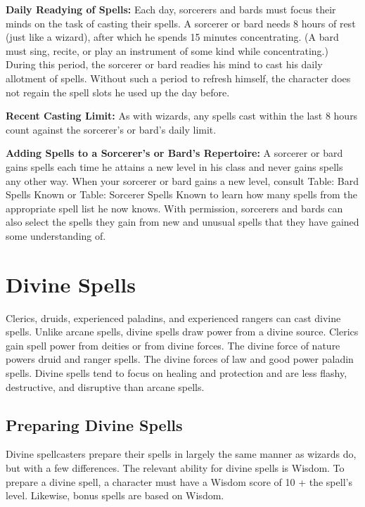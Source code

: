 \textbf{Daily Readying of Spells:} Each day, sorcerers and bards must focus their 
minds on the task of casting their spells. A sorcerer or bard needs 8 hours of 
rest (just like a wizard), after which he spends 15 minutes concentrating. (A bard 
must sing, recite, or play an instrument of some kind while concentrating.) During 
this period, the sorcerer or bard readies his mind to cast his daily allotment 
of spells. Without such a period to refresh himself, the character does not regain 
the spell slots he used up the day before.

\textbf{Recent Casting Limit:} As with wizards, any spells cast within the last 
8 hours count against the sorcerer's or bard's daily limit.

\textbf{Adding Spells to a Sorcerer's or Bard's Repertoire:} A sorcerer or bard 
gains spells each time he attains a new level in his class and never gains spells 
any other way. When your sorcerer or bard gains a new level, consult Table: Bard 
Spells Known or Table: Sorcerer Spells Known to learn how many spells from the 
appropriate spell list he now knows. With permission, sorcerers and bards can also 
select the spells they gain from new and unusual spells that they have gained some 
understanding of.

\section{Divine Spells}

Clerics, druids, experienced paladins, and experienced rangers can cast divine 
spells. Unlike arcane spells, divine spells draw power from a divine source. Clerics 
gain spell power from deities or from divine forces. The divine force of nature 
powers druid and ranger spells. The divine forces of law and good power paladin 
spells. Divine spells tend to focus on healing and protection and are less flashy, 
destructive, and disruptive than arcane spells.

\subsection{Preparing Divine Spells}

Divine spellcasters prepare their spells in largely the same manner as wizards 
do, but with a few differences. The relevant ability for divine spells is Wisdom. 
To prepare a divine spell, a character must have a Wisdom score of 10 + the spell's 
level. Likewise, bonus spells are based on Wisdom.

